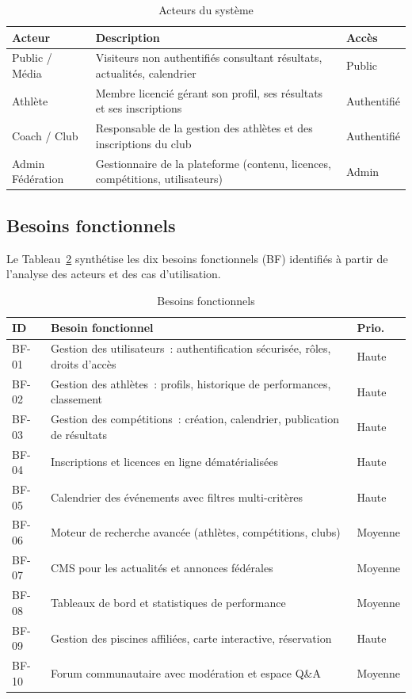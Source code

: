 \documentclass[conference]{IEEEtran}
\begin{document}
\begin{table}[h]
\caption{Acteurs du système}
\label{tab:acteurs}
\centering
\begin{tabular}{p{1.6cm}p{4.8cm}p{1.3cm}}
\toprule
\textbf{Acteur} & \textbf{Description} & \textbf{Accès} \\
\midrule
Public / Média & Visiteurs non authentifiés consultant résultats, actualités, calendrier & Public \\
Athlète & Membre licencié gérant son profil, ses résultats et ses inscriptions & Authentifié \\
Coach / Club & Responsable de la gestion des athlètes et des inscriptions du club & Authentifié \\
Admin Fédération & Gestionnaire de la plateforme (contenu, licences, compétitions, utilisateurs) & Admin \\
\bottomrule
\end{tabular}
\end{table}

\subsection{Besoins fonctionnels}
Le Tableau~\ref{tab:bf} synthétise les dix besoins fonctionnels (BF) identifiés à partir de l'analyse des acteurs et des cas d'utilisation.

\begin{table}[h]
\caption{Besoins fonctionnels}
\label{tab:bf}
\centering
\begin{tabular}{p{0.5cm}p{6cm}p{0.9cm}}
\toprule
\textbf{ID} & \textbf{Besoin fonctionnel} & \textbf{Prio.} \\
\midrule
BF-01 & Gestion des utilisateurs~: authentification sécurisée, rôles, droits d'accès & Haute \\
BF-02 & Gestion des athlètes~: profils, historique de performances, classement & Haute \\
BF-03 & Gestion des compétitions~: création, calendrier, publication de résultats & Haute \\
BF-04 & Inscriptions et licences en ligne dématérialisées & Haute \\
BF-05 & Calendrier des événements avec filtres multi-critères & Haute \\
BF-06 & Moteur de recherche avancée (athlètes, compétitions, clubs) & Moyenne \\
BF-07 & CMS pour les actualités et annonces fédérales & Moyenne \\
BF-08 & Tableaux de bord et statistiques de performance & Moyenne \\
BF-09 & Gestion des piscines affiliées, carte interactive, réservation & Haute \\
BF-10 & Forum communautaire avec modération et espace Q\&A & Moyenne \\
\bottomrule
\end{tabular}
\end{table}
\end{document}
